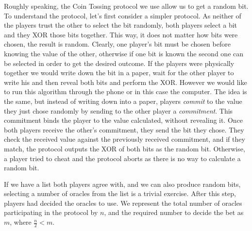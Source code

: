 Roughly speaking, the Coin Tossing protocol we use allow us to get a random bit.
To understand the protocol, let's first consider a simpler protocol.
As neither of the players trust the other to select the bit randomly, both
  players select a bit and they XOR those bits together.
This way, it does not matter how bits were chosen, the result is random.
Clearly, one player's bit must be chosen before knowing the value of  the other,
  otherwise if one bit is known the second one can be selected in order to get
  the desired outcome.
If the players were physically together we would write down the bit in a paper,
  wait for the other player to write his and then reveal both bits and perform
  the XOR\@.
However we would like to run this algorithm through the phone or in this case
  the computer.
The idea is the same, but instead of writing down into a paper, players
  \textit{commit} to the value they just chose randomly by sending to the other
  player a \textit{commitment}.
This commitment binds the player to the value calculated, without revealing it.
Once both players receive the other's commitment, they send the bit they chose.
They check the received value against the previously received commitment, and if
  they match, the protocol outputs the XOR of both bits as the random bit.
Otherwise, a player tried to cheat and the protocol aborts as there is no way to
  calculate a random bit.

If we have a list both players agree with, and we can also produce random bits,
  selecting a number of oracles from the list is a trivial exercise.
After this step, players had decided the oracles to use.
We represent the total number of oracles participating in the protocol by $n$,
  and the required number to decide the bet as $m$, where $\frac{n}{2} < m$.
